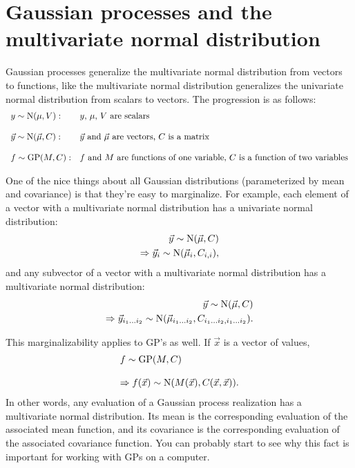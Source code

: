 \section{Gaussian processes and the multivariate normal distribution}

Gaussian processes generalize the multivariate normal distribution from vectors to functions, like the multivariate normal distribution generalizes the univariate normal distribution from scalars to vectors. The progression is as follows:
\begin{equation}
    \begin{array}{ll}
        y\sim\textup N(\mu,V): & \textup{$y$, $\mu$, $V$ are scalars}\\\\
        \vec y\sim\textup N(\vec \mu,C): & \textup{$\vec y$ and $\vec \mu$ are vectors, $C$ is a matrix}\\\\
        f\sim\textup{GP}(M, C): & \textup{$f$ and $M$ are functions of one variable, $C$ is a function of two variables}
    \end{array}
\end{equation}

One of the nice things about all Gaussian distributions (parameterized by mean and covariance) is that they're easy to marginalize. For example, each element of a vector with a multivariate normal distribution has a univariate normal distribution:
\begin{eqnarray*}
    \vec y\sim\textup N(\vec \mu,C)\\
    \Rightarrow \vec y_i\sim\textup N(\vec \mu_i,C_{i,i}),
\end{eqnarray*}
and any subvector of a vector with a multivariate normal distribution has a multivariate normal distribution:
\begin{eqnarray*}
    \vec y\sim\textup N(\vec \mu,C)\\
    \Rightarrow \vec y_{i_1\ldots i_2}\sim\textup N(\vec \mu_{i_1\ldots i_2},C_{i_1\ldots i_2,i_1\ldots i_2}).
\end{eqnarray*}

This marginalizability applies to GP's as well. If $\vec x$ is a vector of values,
\begin{equation}
    \begin{array}{l}
        f\sim\textup{GP}(M, C)\\\\
        \Rightarrow f(\vec x) \sim\textup N(M(\vec x), C(\vec x,\vec x)).
    \end{array}
\end{equation}
In other words, any evaluation of a Gaussian process realization has a multivariate normal distribution. Its mean is the corresponding evaluation of the associated mean function, and its covariance is the corresponding evaluation of the associated covariance function. You can probably start to see why this fact is important for working with GPs on a computer.

